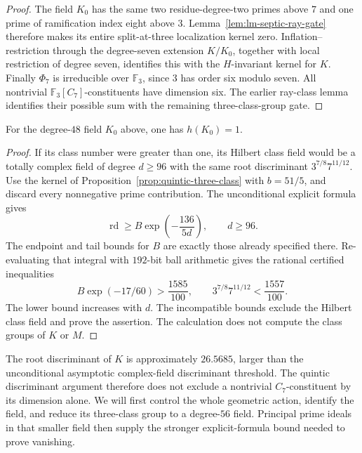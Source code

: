 \begin{proof}
The field $K_0$ has the same two residue-degree-two
primes above $7$ and one prime of ramification index
eight above $3$.  Lemma~\ref{lem:lm-septic-ray-gate}
therefore makes its entire split-at-three localization
kernel zero.  Inflation--restriction through the
degree-seven extension $K/K_0$, together with local
restriction of degree seven, identifies this with the
$H$-invariant kernel for $K$.
Finally $\Phi_7$ is irreducible over $\mathbb F_3$,
since $3$ has order six modulo seven.  All nontrivial
$\mathbb F_3[C_7]$-constituents have dimension six.
The earlier ray-class lemma identifies their possible
sum with the remaining three-class-group gate.
\end{proof}

\begin{corollary}\label{cor:septic-auxiliary-class-one}
For the degree-$48$ field $K_0$ above, one has $h(K_0)=1$.
\end{corollary}
\begin{proof}
If its class number were greater than one, its Hilbert class
field would be a totally complex field of degree $d\ge96$
with the same root discriminant
$3^{7/8}7^{11/12}$. Use the kernel of
Proposition~\ref{prop:quintic-three-class} with $b=51/5$,
and discard every nonnegative prime contribution. The
unconditional explicit formula gives
\[
 \operatorname{rd}\ge B\exp\!\left(-\frac{136}{5d}\right),
 \qquad d\ge96.
\]
The endpoint and tail bounds for $B$ are exactly those already
specified there. Re-evaluating that integral with $192$-bit
ball arithmetic gives the rational certified inequalities
\[
 B\exp(-17/60)>\frac{1585}{100},
 \qquad 3^{7/8}7^{11/12}<\frac{1557}{100}.
\]
The lower bound increases with $d$. The incompatible bounds
exclude the Hilbert class field and prove the assertion.
The calculation does not compute the class groups of $K$ or $M$.
\end{proof}

\begin{remark}
\label{rem:septic-smaller-field}
The root discriminant of $K$ is approximately $26.5685$, larger
than the unconditional asymptotic complex-field discriminant threshold.
The quintic discriminant argument therefore does not exclude a
nontrivial $C_7$-constituent by its dimension alone. We will first
control the whole geometric action, identify the field, and reduce
its three-class group to a degree-$56$ field. Principal prime ideals
in that smaller field then supply the stronger explicit-formula bound
needed to prove vanishing.
\end{remark}
